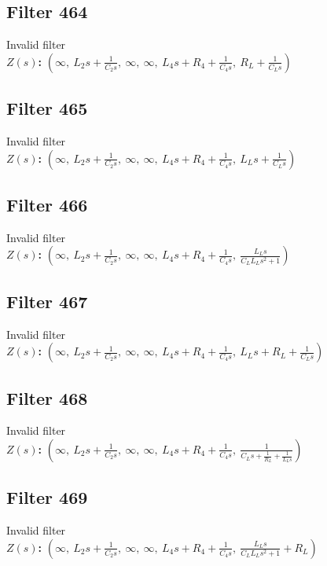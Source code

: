 \documentclass{article}
\begin{document}
\subsection*{Filter 464}
Invalid filter \\ 
\textbf{$Z(s)$:} $\left( \infty, \  L_{2} s + \frac{1}{C_{2} s}, \  \infty, \  \infty, \  L_{4} s + R_{4} + \frac{1}{C_{4} s}, \  R_{L} + \frac{1}{C_{L} s}\right)$ \\ 
\subsection*{Filter 465}
Invalid filter \\ 
\textbf{$Z(s)$:} $\left( \infty, \  L_{2} s + \frac{1}{C_{2} s}, \  \infty, \  \infty, \  L_{4} s + R_{4} + \frac{1}{C_{4} s}, \  L_{L} s + \frac{1}{C_{L} s}\right)$ \\ 
\subsection*{Filter 466}
Invalid filter \\ 
\textbf{$Z(s)$:} $\left( \infty, \  L_{2} s + \frac{1}{C_{2} s}, \  \infty, \  \infty, \  L_{4} s + R_{4} + \frac{1}{C_{4} s}, \  \frac{L_{L} s}{C_{L} L_{L} s^{2} + 1}\right)$ \\ 
\subsection*{Filter 467}
Invalid filter \\ 
\textbf{$Z(s)$:} $\left( \infty, \  L_{2} s + \frac{1}{C_{2} s}, \  \infty, \  \infty, \  L_{4} s + R_{4} + \frac{1}{C_{4} s}, \  L_{L} s + R_{L} + \frac{1}{C_{L} s}\right)$ \\ 
\subsection*{Filter 468}
Invalid filter \\ 
\textbf{$Z(s)$:} $\left( \infty, \  L_{2} s + \frac{1}{C_{2} s}, \  \infty, \  \infty, \  L_{4} s + R_{4} + \frac{1}{C_{4} s}, \  \frac{1}{C_{L} s + \frac{1}{R_{L}} + \frac{1}{L_{L} s}}\right)$ \\ 
\subsection*{Filter 469}
Invalid filter \\ 
\textbf{$Z(s)$:} $\left( \infty, \  L_{2} s + \frac{1}{C_{2} s}, \  \infty, \  \infty, \  L_{4} s + R_{4} + \frac{1}{C_{4} s}, \  \frac{L_{L} s}{C_{L} L_{L} s^{2} + 1} + R_{L}\right)$ \\ 
\end{document}
